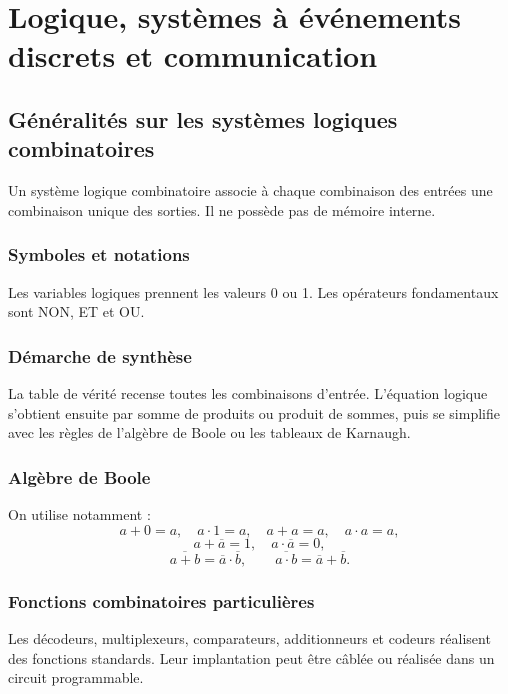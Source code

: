 \chapter{Logique, systèmes à événements discrets et communication}

\section{Généralités sur les systèmes logiques combinatoires}
Un système logique combinatoire associe à chaque combinaison des entrées une combinaison unique des sorties. Il ne possède pas de mémoire interne.

\subsection{Symboles et notations}
Les variables logiques prennent les valeurs 0 ou 1. Les opérateurs fondamentaux sont NON, ET et OU.
\begin{center}\TLPortesLogiques\end{center}

\subsection{Démarche de synthèse}
\begin{center}\TLDemarcheCombinatoire\end{center}
La table de vérité recense toutes les combinaisons d'entrée. L'équation logique s'obtient ensuite par somme de produits ou produit de sommes, puis se simplifie avec les règles de l'algèbre de Boole ou les tableaux de Karnaugh.

\subsection{Algèbre de Boole}
On utilise notamment :
\[
a+0=a,\quad a\cdot1=a,\quad a+a=a,\quad a\cdot a=a,
\]
\[
a+\overline a=1,\quad a\cdot\overline a=0,
\]
\[
\overline{a+b}=\overline a\cdot\overline b,\qquad
\overline{a\cdot b}=\overline a+\overline b.
\]

\subsection{Fonctions combinatoires particulières}
Les décodeurs, multiplexeurs, comparateurs, additionneurs et codeurs réalisent des fonctions standards. Leur implantation peut être câblée ou réalisée dans un circuit programmable.

